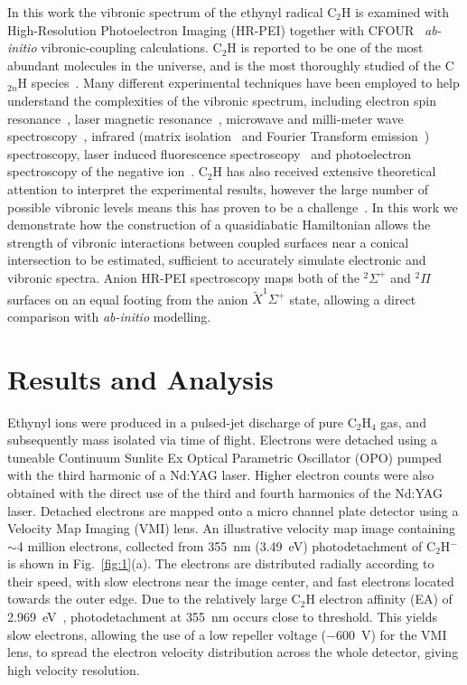 \documentclass[journal=jpcafh,manuscript=article,layout=onecolumn, 12pt]{achemso}
\begin{document}
In this work the vibronic spectrum of the ethynyl radical C$_2$H is examined with High-Resolution Photoelectron Imaging (HR-PEI) together with CFOUR~\cite{dev20}  \emph{ab-initio} vibronic-coupling calculations. C$_2$H is reported to be one of the most abundant molecules in the universe, and is the most thoroughly studied of the C$_{2n}$H species~\cite{wil91,hei99,for10}. Many different experimental techniques have been employed to help understand the complexities of the vibronic spectrum, including electron spin resonance~\cite{coc64,jin85}, laser magnetic resonance~\cite{bro88,pfe96,sch98}, microwave and milli-meter wave spectroscopy~\cite{sas81,got83,end89,mul00}, infrared (matrix isolation~\cite{she87,jac87,for95} and Fourier Transform emission~\cite{ver88}) spectroscopy, laser induced fluorescence spectroscopy~\cite{hsu93,hsu95,chi99} and photoelectron spectroscopy of the negative ion~\cite{erv91,tay98,zho07}. C$_2$H has also received extensive theoretical attention to interpret the experimental results, however the large number of possible vibronic levels means this has proven to be a challenge~\cite{per90,per91,per91b,per91c,per92,car00,tar03,tar04,for10,sta21,gul21}. In this work we demonstrate how the construction of a quasidiabatic Hamiltonian allows the strength of vibronic interactions between coupled surfaces near a conical intersection to be estimated, sufficient to accurately simulate electronic and vibronic spectra. Anion HR-PEI spectroscopy maps both of the $^2\Sigma^+$ and $^2\Pi$ surfaces on an equal footing from the anion $\tilde{X}^1\Sigma^+$ state, allowing a direct comparison with \emph{ab-initio} modelling.

\section{Results and Analysis}
Ethynyl ions were produced in a pulsed-jet discharge of pure C$_2$H$_4$ gas, and subsequently mass isolated via time of flight. Electrons were detached using a tuneable Continuum Sunlite Ex Optical Parametric Oscillator (OPO) pumped with the third harmonic of a Nd:YAG laser. Higher electron counts were also obtained with the direct use of the third and fourth harmonics of the Nd:YAG laser. Detached electrons are mapped onto a micro channel plate detector using a Velocity Map Imaging (VMI) lens. An illustrative velocity map image containing $\sim$4 million electrons, collected from 355~nm (3.49~eV) photodetachment of C$_2$H$^-$ is shown in Fig.~\ref{fig:1}(a). The electrons are distributed radially according to their speed, with slow electrons near the image center, and fast electrons located towards the outer edge. Due to the relatively large C$_2$H electron affinity (EA) of 2.969~eV~\cite{erv91}, photodetachment at 355~nm occurs close to threshold. This yields slow electrons, allowing the use of a low repeller voltage ($-600$~V) for the VMI lens, to spread the electron velocity distribution across the whole detector, giving high velocity resolution. 
\end{document}
